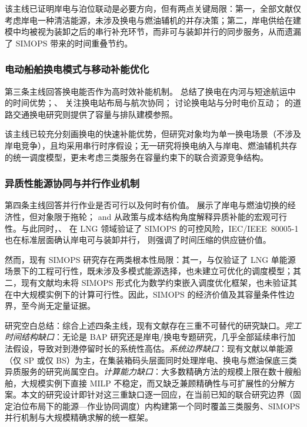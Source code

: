 \documentclass[UTF8, a4paper, 12pt]{ctexart}
\theoremstyle{plain}
\theoremstyle{definition}
\theoremstyle{remark}
\begin{document}
该主线已证明岸电与泊位联动是必要方向，但有两点关键局限：第一，全部文献仅考虑岸电一种清洁能源，未涉及换电与燃油辅机的并存决策；第二，岸电供给在建模中均被视为装卸之后的串行补充环节，而非可与装卸并行的同步服务，从而遗漏了 SIMOPS 带来的时间重叠节约。
 
\subsubsection{电动船舶换电模式与移动补能优化}
 
第三条主线回答换电能否作为高时效补能机制。\citet{Zhang2022_EShip} 总结了换电在内河与短途航运中的时间优势；\citet{Bei2024}、\citet{Zhang2024_Voyage} 关注换电站布局与航次协同；\citet{Li2022_BSS} 讨论换电站与分时电价互动；\citet{Mak2013} 的道路交通换电研究则提供了容量与排队建模参照。
 
该主线已较充分刻画换电的快速补能优势，但研究对象均为单一换电场景（不涉及岸电竞争），且均采用串行时序假设；无一研究将换电纳入与岸电、燃油辅机共存的统一调度模型，更未考虑三类服务在容量约束下的联合资源竞争结构。
 
\subsubsection{异质性能源协同与并行作业机制}
 
第四条主线回答并行作业是否可行以及何时有价值。\citet{Zhen2022_SP} 展示了岸电与燃油切换的经济性，但对象限于拖轮；\citet{Psaraftis2016} and \citet{Wang2023} 从政策与成本结构角度解释异质补能的宏观可行性。与此同时，\citet{Fan2021}、\citet{Fan2022_SIMOPS} 在 LNG 领域验证了 SIMOPS 的可控风险，IEC/IEEE~80005-1 \cite{IEC80005} 也在标准层面确认岸电可与装卸并行，\citet{Notteboom2006} 则强调了时间压缩的供应链价值。
 
然而，现有 SIMOPS 研究存在两类根本性局限：其一，\citet{Fan2021}与\citet{Fan2022_SIMOPS}仅验证了 LNG 单能源场景下的工程可行性，既未涉及多模式能源选择，也未建立可优化的调度模型；其二，现有文献均未将 SIMOPS 形式化为数学约束嵌入调度优化框架，也未验证其在中大规模实例下的计算可行性。因此，SIMOPS 的经济价值及其容量条件性边界，至今尚无定量证据。
 
研究空白总结：综合上述四条主线，现有文献存在三重不可替代的研究缺口。\emph{完工时间结构缺口}：无论是 BAP 研究还是岸电/换电专题研究，几乎全部延续串行加法假设，导致对到港停留时长的系统性高估。\emph{系统边界缺口}：现有文献以单能源（仅 SP 或仅 BS）为主，在集装箱码头层面同时处理岸电、换电与燃油保底三类异质服务的研究尚属空白。\emph{计算能力缺口}：大多数精确方法的规模上限在数十艘船舶，大规模实例下直接 MILP 不稳定，而又缺乏兼顾精确性与可扩展性的分解方案。本文的研究设计即针对这三重缺口逐一回应，在当前已知的联合研究边界（固定泊位布局下的能源—作业协同调度）内构建第一个同时覆盖三类服务、SIMOPS 并行机制与大规模精确求解的统一框架。
\end{document}
